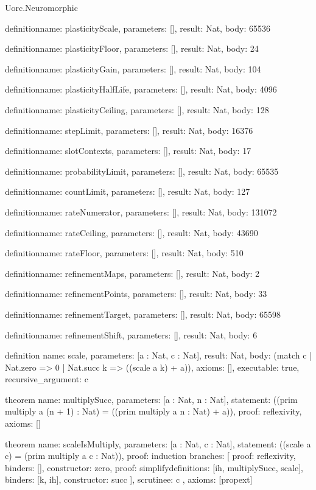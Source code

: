 \begin{lexlean}{Uorc.Neuromorphic}
\begin{semanticmodule}
definition{name: plasticityScale, parameters: [], result: Nat, body: 65536}

definition{name: plasticityFloor, parameters: [], result: Nat, body: 24}

definition{name: plasticityGain, parameters: [], result: Nat, body: 104}

definition{name: plasticityHalfLife, parameters: [], result: Nat, body: 4096}

definition{name: plasticityCeiling, parameters: [], result: Nat, body: 128}

definition{name: stepLimit, parameters: [], result: Nat, body: 16376}

definition{name: slotContexts, parameters: [], result: Nat, body: 17}

definition{name: probabilityLimit, parameters: [], result: Nat, body: 65535}

definition{name: countLimit, parameters: [], result: Nat, body: 127}

definition{name: rateNumerator, parameters: [], result: Nat, body: 131072}

definition{name: rateCeiling, parameters: [], result: Nat, body: 43690}

definition{name: rateFloor, parameters: [], result: Nat, body: 510}

definition{name: refinementMaps, parameters: [], result: Nat, body: 2}

definition{name: refinementPoints, parameters: [], result: Nat, body: 33}

definition{name: refinementTarget, parameters: [], result: Nat, body: 65598}

definition{name: refinementShift, parameters: [], result: Nat, body: 6}

definition{
  name: scale,
  parameters: [a : Nat, c : Nat],
  result: Nat,
  body: (match c | Nat.zero => 0 | Nat.succ k => ((scale a k) + a)),
  axioms: [],
  executable: true,
  recursive_argument: c
}

theorem{
  name: multiplySucc,
  parameters: [a : Nat, n : Nat],
  statement: ((prim multiply a (n + 1) : Nat) = ((prim multiply a n : Nat) + a)),
  proof: reflexivity{},
  axioms: []
}

theorem{
  name: scaleIsMultiply,
  parameters: [a : Nat, c : Nat],
  statement: ((scale a c) = (prim multiply a c : Nat)),
  proof: induction{
    branches: [
      {proof: reflexivity{}, binders: [], constructor: zero},
      {proof: simplify{definitions: [ih, multiplySucc, scale]}, binders: [k, ih], constructor: succ}
    ],
    scrutinee: c
  },
  axioms: [propext]
}


\end{semanticmodule}
\end{lexlean}
